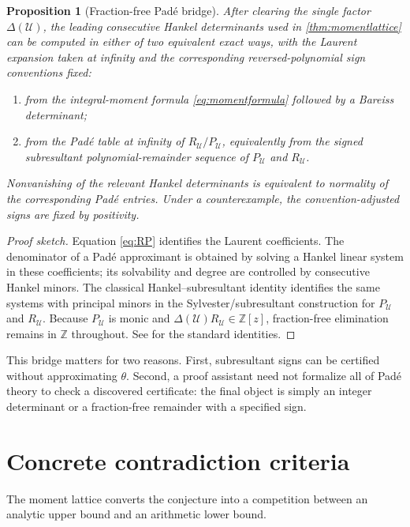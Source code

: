 \documentclass[11pt]{article}
\newtheorem{proposition}[theorem]{Proposition}
\theoremstyle{definition}
\theoremstyle{remark}
\newcommand{\Z}{\mathbb Z}
\newcommand{\UU}{\mathcal U}
\begin{document}
\begin{proposition}[Fraction-free Pad\'e bridge]\label{prop:pade}
After clearing the single factor $\Delta(\UU)$, the leading consecutive Hankel determinants
used in \cref{thm:momentlattice} can be computed in either of two equivalent exact ways,
with the Laurent expansion taken at infinity and the corresponding reversed-polynomial
sign conventions fixed:
\begin{enumerate}[label=(\roman*)]
\item from the integral-moment formula \eqref{eq:momentformula} followed by a Bareiss
      determinant;
\item from the Pad\'e table at infinity of $R_\UU/P_\UU$, equivalently from the signed
      subresultant polynomial-remainder sequence of $P_\UU$ and $R_\UU$.
\end{enumerate}
Nonvanishing of the relevant Hankel determinants is equivalent to normality of the
corresponding Pad\'e entries.  Under a counterexample, the convention-adjusted signs are
fixed by positivity.
\end{proposition}

\begin{proof}[Proof sketch]
Equation \eqref{eq:RP} identifies the Laurent coefficients.  The denominator of a Pad\'e
approximant is obtained by solving a Hankel linear system in these coefficients; its
solvability and degree are controlled by consecutive Hankel minors.  The classical
Hankel--subresultant identity identifies the same systems with principal minors in the
Sylvester/subresultant construction for $P_\UU$ and $R_\UU$.  Because $P_\UU$ is monic and
$\Delta(\UU)R_\UU\in\Z[z]$, fraction-free elimination remains in $\Z$ throughout.  See
\cite{wall,bakergraves,krattenthaler} for the standard identities.
\end{proof}

This bridge matters for two reasons.  First, subresultant signs can be certified without
approximating $\theta$.  Second, a proof assistant need not formalize all of Pad\'e theory to
check a discovered certificate: the final object is simply an integer determinant or a
fraction-free remainder with a specified sign.

\section{Concrete contradiction criteria}

The moment lattice converts the conjecture into a competition between an analytic upper
bound and an arithmetic lower bound.
\end{document}
